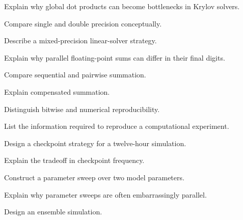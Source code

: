 \begin{exercise}[3]
Explain why global dot products can become bottlenecks in Krylov solvers.
\end{exercise}

\begin{exercise}[3]
Compare single and double precision conceptually.
\end{exercise}

\begin{exercise}[3]
Describe a mixed-precision linear-solver strategy.
\end{exercise}

\begin{exercise}[3]
Explain why parallel floating-point sums can differ in their final digits.
\end{exercise}

\begin{exercise}[3]
Compare sequential and pairwise summation.
\end{exercise}

\begin{exercise}[3]
Explain compensated summation.
\end{exercise}

\begin{exercise}[3]
Distinguish bitwise and numerical reproducibility.
\end{exercise}

\begin{exercise}[3]
List the information required to reproduce a computational experiment.
\end{exercise}

\begin{exercise}[3]
Design a checkpoint strategy for a twelve-hour simulation.
\end{exercise}

\begin{exercise}[3]
Explain the tradeoff in checkpoint frequency.
\end{exercise}

\begin{exercise}[3]
Construct a parameter sweep over two model parameters.
\end{exercise}

\begin{exercise}[3]
Explain why parameter sweeps are often embarrassingly parallel.
\end{exercise}

\begin{exercise}[3]
Design an ensemble simulation.
\end{exercise}

